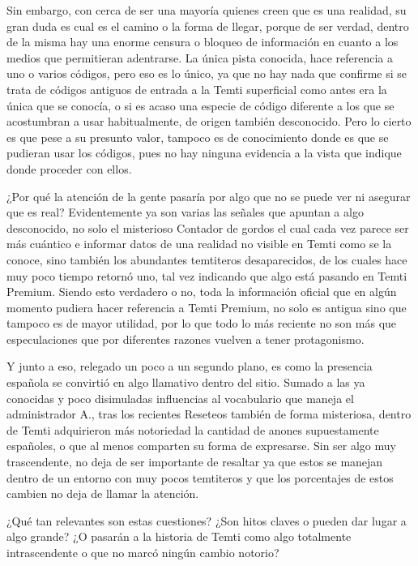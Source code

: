 \documentclass[
  spanish,
]{book}
\begin{document}
Sin embargo, con cerca de ser una mayoría quienes creen que es una realidad, su gran duda es cual es el camino o la forma de llegar, porque de ser verdad, dentro de la misma hay una enorme censura o bloqueo de información en cuanto a los medios que permitieran adentrarse. La única pista conocida, hace referencia a uno o varios códigos, pero eso es lo único, ya que no hay nada que confirme si se trata de códigos antiguos de entrada a la Temti superficial como antes era la única que se conocía, o si es acaso una especie de código diferente a los que se acostumbran a usar habitualmente, de origen también desconocido. Pero lo cierto es que pese a su presunto valor, tampoco es de conocimiento donde es que se pudieran usar los códigos, pues no hay ninguna evidencia a la vista que indique donde proceder con ellos.

¿Por qué la atención de la gente pasaría por algo que no se puede ver ni asegurar que es real? Evidentemente ya son varias las señales que apuntan a algo desconocido, no solo el misterioso Contador de gordos el cual cada vez parece ser más cuántico e informar datos de una realidad no visible en Temti como se la conoce, sino también los abundantes temtiteros desaparecidos, de los cuales hace muy poco tiempo retornó uno, tal vez indicando que algo está pasando en Temti Premium. Siendo esto verdadero o no, toda la información oficial que en algún momento pudiera hacer referencia a Temti Premium, no solo es antigua sino que tampoco es de mayor utilidad, por lo que todo lo más reciente no son más que especulaciones que por diferentes razones vuelven a tener protagonismo.

Y junto a eso, relegado un poco a un segundo plano, es como la presencia española se convirtió en algo llamativo dentro del sitio. Sumado a las ya conocidas y poco disimuladas influencias al vocabulario que maneja el administrador A., tras los recientes Reseteos también de forma misteriosa, dentro de Temti adquirieron más notoriedad la cantidad de anones supuestamente españoles, o que al menos comparten su forma de expresarse. Sin ser algo muy trascendente, no deja de ser importante de resaltar ya que estos se manejan dentro de un entorno con muy pocos temtiteros y que los porcentajes de estos cambien no deja de llamar la atención.

¿Qué tan relevantes son estas cuestiones? ¿Son hitos claves o pueden dar lugar a algo grande? ¿O pasarán a la historia de Temti como algo totalmente intrascendente o que no marcó ningún cambio notorio?
\end{document}
